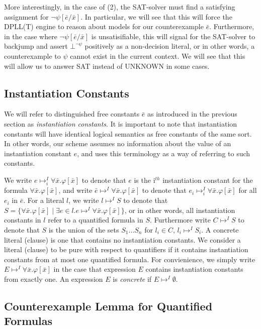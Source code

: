 \documentclass{llncs}
\begin{document}
More interestingly, in the case of (2), the SAT-solver must find a satisfying assignment for $\neg \psi[\bar{e}/\bar{x}]$.
In particular, we will see that this will force the DPLL(T) engine to reason about models for our counterexample $\bar{e}$.
Furthermore, in the case where $\neg \psi[\bar{e}/\bar{x}]$ is unsatisifiable, this will signal for the SAT-solver to backjump and assert $\bot^{\neg \psi}$ positively as a non-decision literal, or in other words, a counterexample to $\psi$ cannot exist in the current context.
We will see that this will allow us to answer SAT instead of UNKNOWN in some cases.

\subsection{Instantiation Constants}

We will refer to distinguished free constants $\bar{e}$ as introduced in the previous section as \emph{instantiation constants}.
It is important to note that instantiation constants will have identical logical semantics as free constants of the same sort.
In other words, our scheme assumes no information about the value of an instantiation constant $e$, and uses this terminology as a way of referring to such constants.

We write $e \mapsto^I_i \forall \bar{x}. \varphi[ \bar{x} ]$ to denote that $e$ is the i$^{th}$ instantiation constant for the formula $\forall \bar{x}. \varphi[ \bar{x} ] $, and write $\bar{e} \mapsto^I \forall \bar{x}. \varphi[ \bar{x} ]$ to denote that $e_i \mapsto^I_i \forall \bar{x}. \varphi[ \bar{x} ]$ for all $e_i$ in $\bar{e}$.
For a literal $l$, we write $l \mapsto^I S$ to denote that $S = \{ \forall \bar{x}. \varphi[ \bar{x} ] \mid \exists e \in l. e \mapsto^I \forall \bar{x}. \varphi[ \bar{x} ] \}$, or in other words, all instantiation constants in $l$ refer to a quantified formula in $S$.
Furthermore write $C \mapsto^I S$ to denote that $S$ is the union of the sets $S_1 \ldots S_n$ for $l_i \in C$, $l_i \mapsto^I S_i$.
A concrete literal (clause) is one that contains no instantiation constants.
We consider a literal (clause) to be pure with respect to quantifiers if it contains instantiation constants from at most one quantified formula.
For convienience, we simply write $E \mapsto^I \forall \bar{x}. \varphi[ \bar{x} ]$ in the case that expression $E$ contains instantiation constants from exactly one.
An expression $E$ is \emph{concrete} if $E \mapsto^I \emptyset$.

\subsection{Counterexample Lemma for Quantified Formulas}
\end{document}
